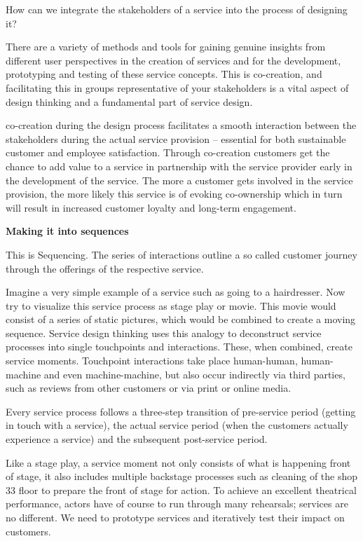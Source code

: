 How can we integrate the stakeholders of a service into the process of designing it?

There are a variety of methods and tools for gaining genuine insights from different user perspectives in the creation of services and for the development, prototyping and testing of these service concepts. This is co-creation, and facilitating this in groups representative of your stakeholders is a vital aspect of design thinking and a fundamental part of service design.

co-creation during the design process facilitates a smooth interaction between the stakeholders during the actual service provision – essential for both sustainable customer and employee satisfaction. Through co-creation customers get the chance to add value to a service in partnership with the service provider early in the development of the service. The more a customer gets involved in the service provision, the more likely this service is of evoking co-ownership which in turn will result in increased customer loyalty and long-term engagement.

\textbf{Making it into sequences} %

This is Sequencing.
The series of interactions outline a so called customer journey through the offerings of the respective service.

Imagine a very simple example of a service such as going to a hairdresser. Now try to visualize this service process as
stage play or movie. This movie would consist of a series of static pictures, which would be combined to create a moving sequence. Service design thinking uses this analogy to deconstruct service processes into single touchpoints and interactions. These, when combined, create service moments. Touchpoint interactions take place human-human, human-machine and even machine-machine, but also occur indirectly via third parties, such as reviews from other customers or via print or online media.

Every service process follows a three-step transition of pre-service period (getting in touch with a service), the actual service period (when the customers actually experience a service) and the subsequent post-service period.

Like a stage play, a service moment not only consists of what is happening front of stage, it also includes multiple backstage processes such as cleaning of the shop
33
floor to prepare the front of stage for action. To achieve an excellent theatrical performance, actors have of course to run through many rehearsals; services are no different. We need to prototype services and iteratively test their impact on customers.

